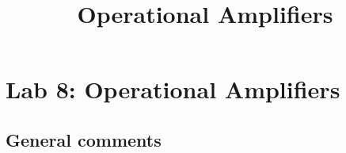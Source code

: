 \documentclass{article}
\title{Operational Amplifiers}
\begin{document}
\maketitle

\section{Lab 8: Operational Amplifiers}

\subsection*{General comments}

\begin{itemize}
\end{itemize}
\end{document}
